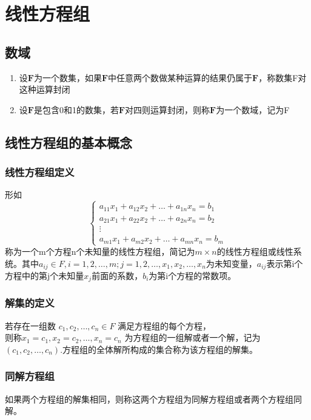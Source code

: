\documentclass[12pt,oneside]{ctexbook}
\begin{document}
\part{线性方程组}
\chapter{数域}
\begin{enumerate}
    \item 设\(\mathbf{F}\)为一个数集，如果\(\mathbf{F}\)中任意两个数做某种运算的结果仍属于\(\mathbf{F}\)，称数集F对这种运算封闭
    \item 设\(\mathbf{F}\)是包含0和1的数集，若\(\mathbf{F}\)对四则运算封闭，则称\(\mathbf{F}\)为一个数域，记为F
\end{enumerate}
\chapter{线性方程组的基本概念}
\section{线性方程组定义}
形如
\[\begin{cases}
    a_{11}x_1 + a_{12}x_2 + \dots + a_{1n}x_n = b_1\\
    a_{21}x_1 + a_{22}x_2 + \dots + a_{2n}x_n = b_2\\
    \vdots \\
    a_{m1}x_1 + a_{m2}x_2 + \dots + a_{mn}x_n = b_m
\end{cases}
\]
称为一个m个方程n个未知量的线性方程组，简记为\(m \times n\)的线性方程组或线性系统。其中\(a_{ij} \in F, i=1,2,\dots ,m; j=1,2,\dots,  x_1 , x_2 , \dots , x_n\)为未知变量，\(a_{ij}\)表示第i个方程中的第j个未知量\(x_j\)前面的系数，\(b_i\)为第i个方程的常数项。

\section{解集的定义}
若存在一组数 \(c_1,c_2,\dots ,c_n \in F\) 满足方程组的每个方程，\\则称\(x_1=c_1,x_2=c_2,\dots ,x_n=c_n\) 为方程组的一组解或者一个解，记为\((c_1,c_2,\dots ,c_n)\).方程组的全体解所构成的集合称为该方程组的解集。

\section{同解方程组}
如果两个方程组的解集相同，则称这两个方程组为同解方程组或者两个方程组同解。
\end{document}
